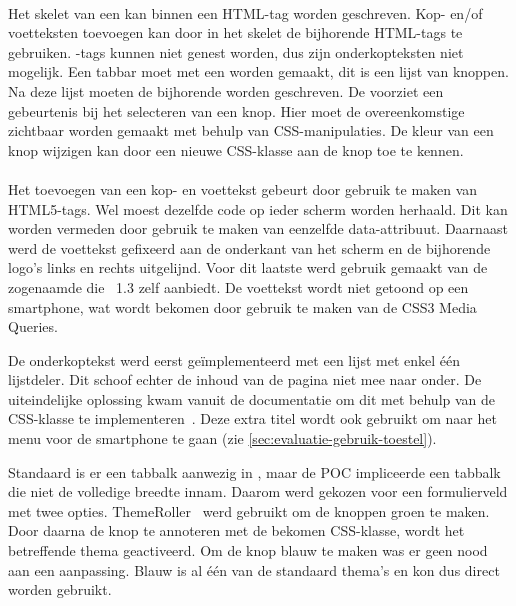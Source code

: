 \paragraph{\kendo}
Het skelet van een  kan binnen een HTML-tag worden geschreven.
Kop- en/of voetteksten toevoegen kan door in het skelet de bijhorende HTML-tags te gebruiken.
-tags kunnen niet genest worden, dus zijn onderkopteksten niet mogelijk.
Een tabbar moet met een  worden gemaakt,  dit is een lijst van knoppen.
Na deze lijst moeten de bijhorende  worden geschreven.
De  voorziet een gebeurtenis bij het selecteren van een knop.
Hier moet de overeenkomstige  zichtbaar worden gemaakt met behulp van CSS-manipulaties.
De kleur van een knop wijzigen kan door een nieuwe CSS-klasse aan de knop toe te kennen.

\paragraph{\jqm}
Het toevoegen van een kop- en voettekst gebeurt door gebruik te maken van HTML5-tags. 
Wel moest dezelfde code op ieder scherm worden herhaald. 
Dit kan worden vermeden door gebruik te maken van eenzelfde data-attribuut. 
Daarnaast werd de voettekst gefixeerd aan de onderkant van het scherm en de bijhorende logo's links en rechts uitgelijnd. 
Voor dit laatste werd gebruik gemaakt van de zogenaamde  die \jqm{}~1.3 zelf aanbiedt. 
De voettekst wordt niet getoond op een smartphone, wat wordt bekomen door gebruik te maken van de CSS3 Media Queries.

De onderkoptekst werd eerst geïmplementeerd met een lijst met enkel één lijstdeler.
Dit schoof echter de inhoud van de pagina niet mee naar onder. 
De uiteindelijke oplossing kwam vanuit de documentatie om dit met behulp van de CSS-klasse  te implementeren~\cite{JQuery2013b}. 
Deze extra titel wordt ook gebruikt om naar het menu voor de smartphone te gaan (zie \ref{sec:evaluatie-gebruik-toestel}).

Standaard is er een tabbalk aanwezig in \jqm, maar de POC impliceerde een tabbalk die niet de volledige breedte innam.
Daarom werd gekozen voor een formulierveld met twee opties.
ThemeRoller~\cite{JQuery2012c} werd gebruikt om de knoppen groen te maken.
Door daarna de knop te annoteren met de bekomen CSS-klasse, wordt het betreffende thema geactiveerd. 
Om de knop blauw te maken was er geen nood aan een aanpassing.
Blauw is al één van de standaard thema's en kon dus direct worden gebruikt.

